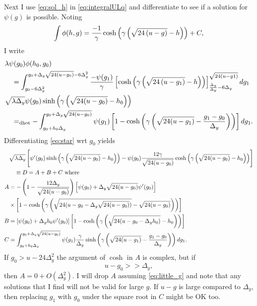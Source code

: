 \documentclass[]{article}
\newcommand{\dhot}{=_{\text{dhot}}}
\begin{document}
Next I use \eqref{eq:sol_h} in \eqref{eq:integralULq} and
differentiate to see if a solution for $\psi(g)$ is possible.  Noting
\begin{equation*}
  \int \phi(h,g) = \frac{-1}{\gamma} \cosh \left( \gamma \left(
      \sqrt{24\left(u-g\right)} - h \right) \right) + C,
\end{equation*}
I write
\begin{align}
  & \lambda \psi(g_0)\phi(h_0,g_0) \nonumber\\
  & \quad =\int_{\LgQ}^{\UgQ} \frac{-\psi(g_1) }{\gamma} \left[
    \cosh\left( \gamma \left( \Rad{-g_1} - h \right)\right) \right]_{
    \frac {\Delta_g} {\Delta_y} - 6 \Delta_y}^{\Rad{-g1}} dg_1
  \nonumber \\
  \label{eq:star}
  & \sqrt{\lambda \Delta_y} \psi(g_0) \phiHG{h_0}{g_0} \nonumber \\
  &\quad \dhot - \int_{\Lg}^{\Ug} \psi(g_1) \left[ 1 - \cosh \left(
      \gamma \left( \sqrt{24(u-g_1)} - \frac{g_1 - g_0}{ \Delta_y}
      \right) \right) \right] dg_1.
\end{align}
Differentiating \eqref{eq:star}  wrt $g_0$ yields
\begin{align}
  & \sqrt{\lambda \Delta_y} \left[ \psi'(g_0) \phiHG{h_0}{g_0} -
   \psi(g_0)  \frac{12 \gamma}{\sqrt{24(u-g_0)}} \cosh\left( \gamma
      \left(\sqrt{24(u-g_0)} -h_0 \right) \right) \right]  \nonumber\\
  \label{eq:d_star_dg}
  & \quad \equiv D = A + B + C \text{ where} \\
  A &= -\left( 1 - \frac{12 \Delta_y}{\sqrt{24(u-g_0)}} \right)
  \left[ \psi(g_0) + \Delta_y\sqrt{24(u-g_0)} \psi'(g_0) \right]  \nonumber\\
  & \times \left[ 1 - \cosh\left( \gamma \left(\sqrt{24(u-g_0 -
          \Delta_y \sqrt{24(u-g_0)})} - \sqrt{24(u-g_0)} \right)
    \right) \right]  \nonumber\\
  B &= \left[ \psi(g_0) + \Delta_y h_0 \psi'(g_0) \right] \left[ 1 -
    \cosh\left( \gamma \left(\sqrt{24(u-g_0 - \Delta_y h_0)} - h_0
      \right) \right) \right]  \nonumber\\
  C &= \int_{\Lg}^{\Ug} \psi(g_1) \frac{\gamma}{\Delta_y}
  \sinh \left( \gamma \left(
      \sqrt{24(u-g_1)} - \frac{g_1 - g_0 }{ \Delta_y}
    \right) \right) dg_1. \nonumber
\end{align}
If $g_0 > u - 24 \Delta_y^2$ the argument of $\cosh$ in $A$ is
complex, but if
\begin{equation}
  \label{eq:little_g}
  u-g_0 >> \Delta_y,
\end{equation}
then $A = 0 + O(\Delta_y^2)$.  I will drop $A$ assuming
\eqref{eq:little_g} and note that any solutions that I find will not
be valid for large $g$.  If $ u-g $ is large compared to $\Delta_y$,
then replacing $g_1$ with $g_0$ under the square root in $C$ might be
OK too.
\end{document}
